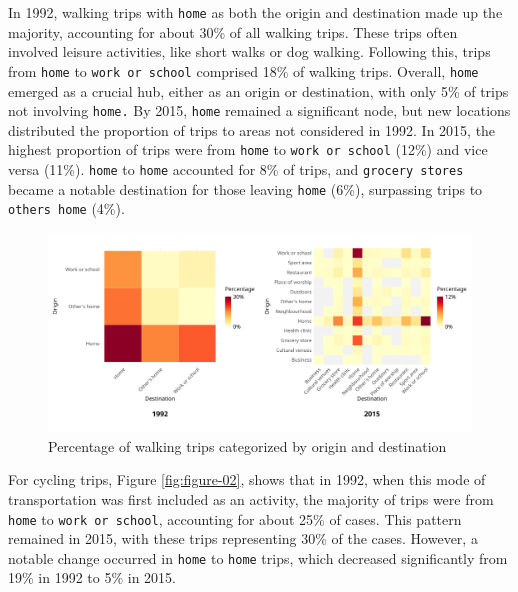 \documentclass[Royal,times,sageh]{sagej}
\begin{document}
In 1992, walking trips with \texttt{home} as both the origin and
destination made up the majority, accounting for about 30\% of all
walking trips. These trips often involved leisure activities, like short
walks or dog walking. Following this, trips from \texttt{home} to
\texttt{work\ or\ school} comprised 18\% of walking trips. Overall,
\texttt{home} emerged as a crucial hub, either as an origin or
destination, with only 5\% of trips not involving \texttt{home.} By
2015, \texttt{home} remained a significant node, but new locations
distributed the proportion of trips to areas not considered in 1992. In
2015, the highest proportion of trips were from \texttt{home} to
\texttt{work\ or\ school} (12\%) and vice versa (11\%). \texttt{home} to
\texttt{home} accounted for 8\% of trips, and \texttt{grocery\ stores}
became a notable destination for those leaving \texttt{home} (6\%),
surpassing trips to \texttt{other\textquotesingle{}s\ home} (4\%).

\begin{figure}

{\centering \includegraphics[width=1\linewidth]{Manuscript-figures/walking_hm_fig} 

}

\caption{Percentage of walking trips categorized by origin and destination}\label{fig:figure-01}
\end{figure}

For cycling trips, Figure \ref{fig:figure-02}, shows that in 1992, when
this mode of transportation was first included as an activity, the
majority of trips were from \texttt{home} to \texttt{work\ or\ school},
accounting for about 25\% of cases. This pattern remained in 2015, with
these trips representing 30\% of the cases. However, a notable change
occurred in \texttt{home} to \texttt{home} trips, which decreased
significantly from 19\% in 1992 to 5\% in 2015.
\end{document}
